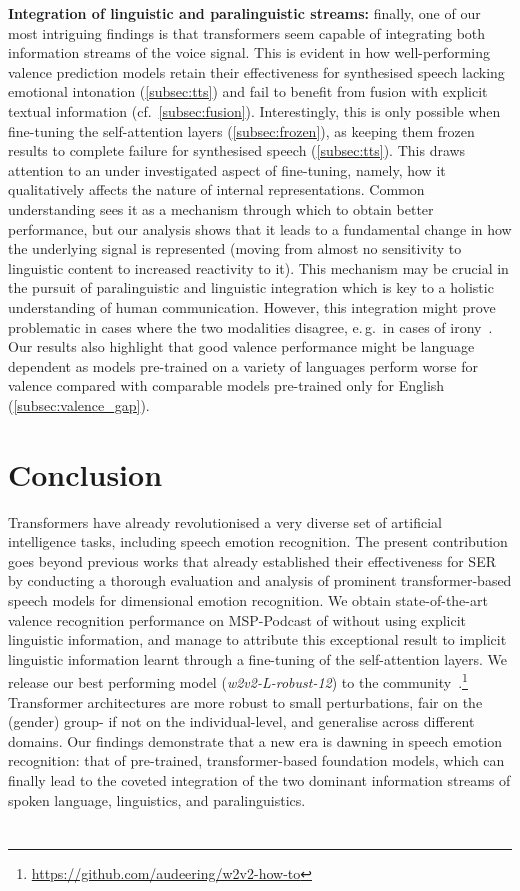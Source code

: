 \documentclass{article}
\newcommand\wrobustpruned{\mbox{\emph{w2v2-L-robust-12}}}
\newcommand\release{\mbox{\url{https://github.com/audeering/w2v2-how-to}}}
\newcommand\msppodcast{\mbox{MSP-Podcast}}
\newcommand{\eg}{e.\,g.\ }
\newcommand{\cf}{{cf.\ }}
\begin{document}
\textbf{Integration of linguistic and paralinguistic streams:}
finally, one of our most intriguing findings is that transformers seem capable of integrating both information streams of the voice signal.
This is evident in how well-performing valence prediction models
retain their effectiveness for synthesised speech lacking emotional intonation (\cref{subsec:tts})
and fail to benefit from fusion with explicit textual information (\cf \cref{subsec:fusion}).
Interestingly, this is only possible when fine-tuning the self-attention layers (\cref{subsec:frozen}),
as keeping them frozen results to complete failure for synthesised speech (\cref{subsec:tts}).
This draws attention to an under investigated aspect of fine-tuning,
namely, how it qualitatively affects the nature of internal representations.
Common understanding sees it as a mechanism through which to obtain better performance,
but our analysis shows that it leads to a fundamental change in how the underlying signal is represented (moving from almost no sensitivity to linguistic content to increased reactivity to it).
This mechanism may be crucial in the pursuit of paralinguistic and linguistic integration
which is key to a holistic understanding of human communication.
However, this integration might prove problematic in cases where the two modalities disagree,
\eg in cases of irony~\citep{burkhardt2017irony}.
Our results also highlight that good valence performance might be language dependent
as models pre-trained on a variety of languages perform worse for valence
compared with comparable models pre-trained only for English (\cref{subsec:valence_gap}).





\section{Conclusion}
\label{sec:conclusion}

Transformers have already revolutionised a very diverse set of artificial intelligence tasks,
including speech emotion recognition.
The present contribution goes beyond previous works
that already established their effectiveness for SER
by conducting a thorough evaluation and analysis of prominent transformer-based speech models
for dimensional emotion recognition.
We obtain state-of-the-art valence recognition performance on {\msppodcast} of 
without using explicit linguistic information,
and manage to attribute this exceptional result
to implicit linguistic information
learnt through a fine-tuning of the self-attention layers.
We release our best performing model ({\wrobustpruned}) to the community~\citep{wagner2022model}.\footnote{{\release}}
Transformer architectures are more robust to small perturbations,
fair on the (gender) group- if not on the individual-level,
and generalise across different domains.
Our findings demonstrate that a new era is dawning in speech emotion recognition:
that of pre-trained, transformer-based foundation models,
which can finally lead to the coveted integration of the two dominant information streams of spoken language, linguistics, and paralinguistics.


\section{\refname}
\printbibliography[heading=none]
\end{document}
